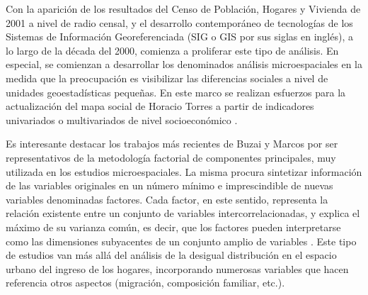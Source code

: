 Con la aparición de los resultados del Censo de Población, Hogares y Vivienda de 2001 a nivel de radio censal, y el desarrollo contemporáneo de tecnologías de los Sistemas de Información Georeferenciada (SIG o GIS por sus siglas en inglés), a lo largo de la década del 2000, comienza a proliferar este tipo de análisis. En especial, se comienzan a desarrollar los denominados análisis microespaciales en la medida que la preocupación es visibilizar las diferencias sociales a nivel de unidades geoestadísticas pequeñas. En este marco se realizan esfuerzos para la  actualización del mapa social de Horacio Torres a partir de indicadores univariados o multivariados de nivel socioeconómico \cite{thuiller,groisman,marcos2011,marcos2015,buzaimarcos2014,abba}.



Es interesante destacar los trabajos más recientes de Buzai y Marcos \cite{buzaimarcos2014,marcos2015} por ser representativos de la metodología factorial de componentes principales, muy utilizada en los estudios microespaciales. La misma procura sintetizar información de las variables originales en un número mínimo e imprescindible de nuevas variables denominadas factores. Cada factor, en este sentido, representa la relación existente entre un conjunto de variables intercorrelacionadas, y explica el máximo de su varianza común, es decir, que los factores pueden interpretarse como las dimensiones subyacentes de un conjunto amplio de variables \cite{marcos2015}. Este tipo de estudios van más allá del análisis de la desigual distribución en el espacio urbano del ingreso de los hogares, incorporando numerosas variables que hacen referencia otros aspectos (migración, composición familiar, etc.).

